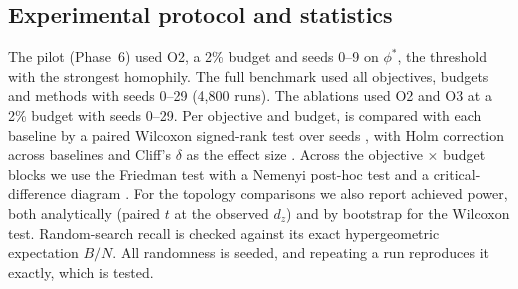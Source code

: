 \subsection{Experimental protocol and statistics}
\label{sec:stats}
The pilot (Phase~6) used O2, a 2\% budget and seeds 0--9 on $\phi^\ast$, the threshold with the strongest homophily. The full benchmark used all objectives, budgets and methods with seeds 0--29 (4{,}800 runs). The ablations used O2 and O3 at a 2\% budget with seeds 0--29. Per objective and budget, \gs{} is compared with each baseline by a paired Wilcoxon signed-rank test over seeds \citep{wilcoxon1945}, with Holm correction across baselines \citep{holm1979} and Cliff's $\delta$ as the effect size \citep{cliff1993dominance}. Across the objective $\times$ budget blocks we use the Friedman test \citep{friedman1937} with a Nemenyi post-hoc test and a critical-difference diagram \citep{demsar2006statistical}. For the topology comparisons we also report achieved power, both analytically (paired $t$ at the observed $d_z$) and by bootstrap for the Wilcoxon test. Random-search recall is checked against its exact hypergeometric expectation $B/N$. All randomness is seeded, and repeating a run reproduces it exactly, which is tested.
